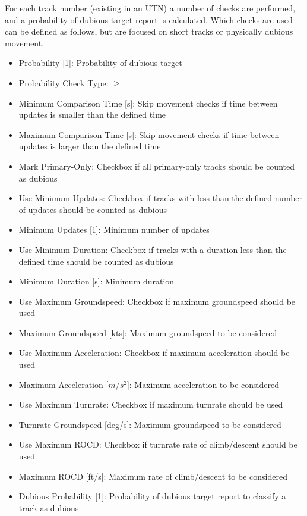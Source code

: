 For each track number (existing in an UTN) a number of checks are performed, and a probability of dubious target report is calculated. Which checks are used can be defined as follows, but are focused on short tracks or physically dubious movement. \\

\begin{itemize}  
\item Probability [1]: Probability of dubious target
\item Probability Check Type: $\geq$
\item Minimum Comparison Time [s]: Skip movement checks if time between updates is smaller than the defined time
\item Maximum Comparison Time [s]: Skip movement checks if time between updates is larger than the defined time
\item Mark Primary-Only: Checkbox if all primary-only tracks should be counted as dubious
\item Use Minimum Updates: Checkbox if tracks with less than the defined number of updates should be counted as dubious
\item Minimum Updates [1]: Minimum number of updates
\item Use Minimum Duration: Checkbox if tracks with a duration less than the defined time should be counted as dubious
\item Minimum Duration [s]: Minimum duration
\item Use Maximum Groundspeed: Checkbox if maximum groundspeed should be used
\item Maximum Groundspeed [kts]: Maximum groundspeed to be considered
\item Use Maximum Acceleration: Checkbox if maximum acceleration should be used
\item Maximum Acceleration [$m/s^{2}$]: Maximum acceleration to be considered
\item Use Maximum Turnrate: Checkbox if maximum turnrate should be used
\item Turnrate Groundspeed [deg/s]: Maximum groundspeed to be considered
\item Use Maximum ROCD: Checkbox if turnrate rate of climb/descent should be used
\item Maximum ROCD [ft/s]: Maximum  rate of climb/descent to be considered
\item Dubious Probability [1]: Probability of dubious target report to classify a track as dubious
\end{itemize}
\ \\

